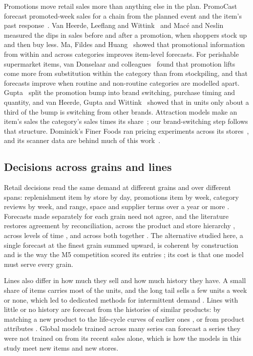 Promotions move retail sales more than anything else in the plan. PromoCast
forecast promoted-week sales for a chain from the planned event and the item's
past response~\cite{promocast}. Van Heerde, Leeflang and
Wittink~\cite{vanheerde2000} and Mac\'e and Neslin~\cite{mace2004} measured
the dips in sales before and after a promotion, when shoppers stock up and then
buy less. Ma, Fildes and Huang~\cite{ma2016} showed that promotional information
from within and across categories improves item-level forecasts. For perishable
supermarket items, van Donselaar and colleagues~\cite{vandonselaar2016} found that
promotion lifts come more from substitution within the category than from
stockpiling, and that forecasts improve when routine and non-routine categories
are modelled apart.
Gupta~\cite{gupta1988} split the promotion bump into brand switching, purchase
timing and quantity, and van Heerde, Gupta and Wittink~\cite{vanheerde2003}
showed that in units only about a third of the bump is switching from other
brands. Attraction models make an item's sales the category's sales times its
share~\cite{bell1975,cooper1988}; our brand-switching step follows that
structure. Dominick's Finer Foods ran pricing experiments across its
stores~\cite{hoch1995}, and its scanner data are behind much of this
work~\cite{dominicks}.

\subsection{Decisions across grains and lines}

Retail decisions read the same demand at different grains and over different
spans: replenishment item by store by day, promotions item by week, category
reviews by week, and range, space and supplier terms over a year or more
\cite{fildes2022}. Forecasts made separately for each grain need not agree, and
the literature restores agreement by reconciliation, across the product and store
hierarchy \cite{hyndman2011,mint}, across levels of time
\cite{athanasopoulos2017}, and across both together
\cite{kourentzes2019crosstemporal}. The alternative studied here, a single
forecast at the finest grain summed upward, is coherent by construction and is
the way the M5 competition scored its entries \cite{m5accuracy}; its cost is
that one model must serve every grain.

Lines also differ in how much they sell and how much history they have. A small
share of items carries most of the units, and the long tail sells a few units a
week or none, which led to dedicated methods for intermittent demand
\cite{croston,syntetos2005}. Lines with little or no history are forecast from
the histories of similar products: by matching a new product to the life-cycle
curves of earlier ones \cite{hu2019newproduct}, or from product attributes
\cite{vansteenbergen2020}. Global models trained across many series
\cite{montero2021} can forecast a series they were not trained on from its
recent sales alone, which is how the models in this study meet new items and
new stores.


